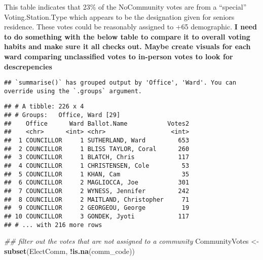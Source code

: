 \documentclass[
]{article}
\newenvironment{Shaded}{\begin{snugshade}}{\end{snugshade}}
\newcommand{\CommentTok}[1]{\textcolor[rgb]{0.56,0.35,0.01}{\textit{#1}}}
\newcommand{\DataTypeTok}[1]{\textcolor[rgb]{0.13,0.29,0.53}{#1}}
\newcommand{\KeywordTok}[1]{\textcolor[rgb]{0.13,0.29,0.53}{\textbf{#1}}}
\newcommand{\NormalTok}[1]{#1}
\newcommand{\OperatorTok}[1]{\textcolor[rgb]{0.81,0.36,0.00}{\textbf{#1}}}
\newcommand{\OtherTok}[1]{\textcolor[rgb]{0.56,0.35,0.01}{#1}}
\newcommand{\StringTok}[1]{\textcolor[rgb]{0.31,0.60,0.02}{#1}}
\begin{document}
This table indicates that 23\% of the NoCommunity votes are from a
``special'' Voting.Station.Type which appears to be the designation
given for seniors residence. These votes could be reasonably assigned to
+65 demographic. \textbf{I need to do something with the below table to
compare it to overall voting habits and make sure it all checks out.
Maybe create visuals for each ward comparing unclassified votes to
in-person votes to look for descrepencies}

\begin{Shaded}
\end{Shaded}

\begin{verbatim}
## `summarise()` has grouped output by 'Office', 'Ward'. You can override using the `.groups` argument.
\end{verbatim}

\begin{verbatim}
## # A tibble: 226 x 4
## # Groups:   Office, Ward [29]
##    Office      Ward Ballot.Name           Votes2
##    <chr>      <int> <chr>                  <int>
##  1 COUNCILLOR     1 SUTHERLAND, Ward         653
##  2 COUNCILLOR     1 BLISS TAYLOR, Coral      260
##  3 COUNCILLOR     1 BLATCH, Chris            117
##  4 COUNCILLOR     1 CHRISTENSEN, Cole         53
##  5 COUNCILLOR     1 KHAN, Cam                 35
##  6 COUNCILLOR     2 MAGLIOCCA, Joe           301
##  7 COUNCILLOR     2 WYNESS, Jennifer         242
##  8 COUNCILLOR     2 MAITLAND, Christopher     71
##  9 COUNCILLOR     2 GEORGEOU, George          19
## 10 COUNCILLOR     3 GONDEK, Jyoti            117
## # ... with 216 more rows
\end{verbatim}

\begin{Shaded}
\begin{Highlighting}[]
\CommentTok{## filter out the votes that are not assigned to a community}
\NormalTok{CommunityVotes <-}\StringTok{ }\KeywordTok{subset}\NormalTok{(ElectComm, }\OperatorTok{!}\KeywordTok{is.na}\NormalTok{(comm_code))}
\end{Highlighting}
\end{Shaded}
\end{document}
